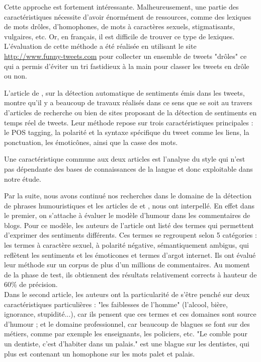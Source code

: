 \documentclass[10pt,a4paper,twoside]{article}
\begin{document}
Cette approche est fortement intéressante. Malheureusement, une partie des caractéristiques nécessite d’avoir énormément de ressources, comme des lexiques de mots drôles, d'homophones, de mots à caractères sexuels, stigmatisants, vulgaires, etc. Or, en français, il est difficile de trouver ce type de lexiques.
L’évaluation de cette méthode a été réalisée en utilisant le site \url{ http://www.funny-tweets.com} pour collecter un ensemble de tweets "drôles" ce qui a permis d’éviter un tri fastidieux à la main pour classer les tweets en drôle ou non.

L’article de \cite{Barbosa2010}, sur la détection automatique de sentiments émis dans les tweets, montre qu’il y a beaucoup de travaux réalisés dans ce sens que se soit au travers d'articles de recherche ou bien de sites proposant de la détection de sentiments en temps réel de tweets. Leur méthode repose sur trois caractéristiques principales : le POS tagging, la polarité et la syntaxe spécifique du tweet comme les liens, la ponctuation, les émoticônes, ainsi que la casse des mots. 

Une caractéristique commune aux deux articles est l’analyse du style qui n’est pas dépendante des bases de connaissances de la langue et donc exploitable dans notre étude. 

Par la suite, nous avons continué nos recherches dans le domaine de la détection de phrases humouristiques et les articles de \cite{ReyesPRS10}  et \cite{MihalceaP07}, nous ont interpellé. En effet dans le premier, on s'attache à évaluer le modèle d'humour dans les commentaires de blogs. Pour ce modèle, les auteurs de l'article ont listé des termes qui permettent d'exprimer des sentiments différents. Ces termes se regroupent selon 5 catégories : les termes à caractère sexuel, à polarité négative, sémantiquement ambigus, qui reflètent les sentiments et les émoticones et termes d'argot internet. Ils ont évalué leur méthode sur un corpus de plus d'un millions de commentaires. Au moment de la phase de test, ils obtiennent des résultats relativement corrects à hauteur de 60\% de précision.
\\Dans le second article, les auteurs ont la particularité de s'être penché sur deux caractéristiques particulières : "les faiblesses de l'homme" (l'alcool, bière, ignorance, stupidité...), car ils pensent que ces termes et ces domaines sont source d'humour ; et le domaine professionnel, car beaucoup de blagues se font sur des métiers, comme par exemple les enseignants, les policiers, etc. "Le comble pour un dentiste, c'est d'habiter dans un palais." est une blague sur les dentistes, qui plus est contenant un homophone sur les mots palet et palais.
\end{document}
